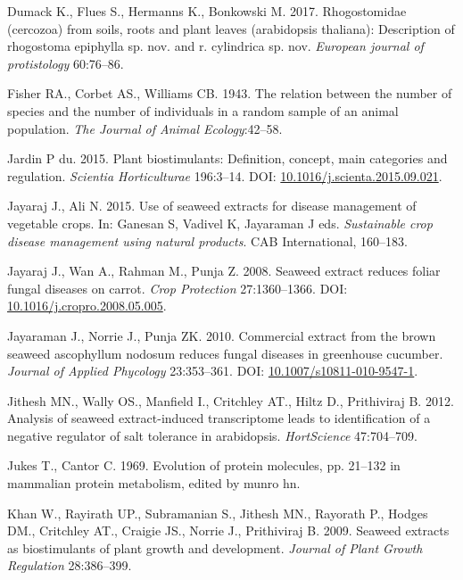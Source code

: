 \documentclass[11pt,]{article}
\begin{document}
\hypertarget{ref-dumack2017rhogostomidae}{}
Dumack K., Flues S., Hermanns K., Bonkowski M. 2017. Rhogostomidae
(cercozoa) from soils, roots and plant leaves (arabidopsis thaliana):
Description of rhogostoma epiphylla sp. nov. and r. cylindrica sp. nov.
\emph{European journal of protistology} 60:76--86.

\hypertarget{ref-fisher1943relation}{}
Fisher RA., Corbet AS., Williams CB. 1943. The relation between the
number of species and the number of individuals in a random sample of an
animal population. \emph{The Journal of Animal Ecology}:42--58.

\hypertarget{ref-duJardin2015}{}
Jardin P du. 2015. Plant biostimulants: Definition, concept, main
categories and regulation. \emph{Scientia Horticulturae} 196:3--14. DOI:
\href{https://doi.org/10.1016/j.scienta.2015.09.021}{10.1016/j.scienta.2015.09.021}.

\hypertarget{ref-Jayaraj2015sustainable}{}
Jayaraj J., Ali N. 2015. Use of seaweed extracts for disease management
of vegetable crops. In: Ganesan S, Vadivel K, Jayaraman J eds.
\emph{Sustainable crop disease management using natural products}. CAB
International, 160--183.

\hypertarget{ref-Jayaraj2008}{}
Jayaraj J., Wan A., Rahman M., Punja Z. 2008. Seaweed extract reduces
foliar fungal diseases on carrot. \emph{Crop Protection} 27:1360--1366.
DOI:
\href{https://doi.org/10.1016/j.cropro.2008.05.005}{10.1016/j.cropro.2008.05.005}.

\hypertarget{ref-Jayaraman2010}{}
Jayaraman J., Norrie J., Punja ZK. 2010. Commercial extract from the
brown seaweed ascophyllum nodosum reduces fungal diseases in greenhouse
cucumber. \emph{Journal of Applied Phycology} 23:353--361. DOI:
\href{https://doi.org/10.1007/s10811-010-9547-1}{10.1007/s10811-010-9547-1}.

\hypertarget{ref-jithesh2012analysis}{}
Jithesh MN., Wally OS., Manfield I., Critchley AT., Hiltz D.,
Prithiviraj B. 2012. Analysis of seaweed extract-induced transcriptome
leads to identification of a negative regulator of salt tolerance in
arabidopsis. \emph{HortScience} 47:704--709.

\hypertarget{ref-jukes1969evolution}{}
Jukes T., Cantor C. 1969. Evolution of protein molecules, pp. 21--132 in
mammalian protein metabolism, edited by munro hn.

\hypertarget{ref-khan2009seaweed}{}
Khan W., Rayirath UP., Subramanian S., Jithesh MN., Rayorath P., Hodges
DM., Critchley AT., Craigie JS., Norrie J., Prithiviraj B. 2009. Seaweed
extracts as biostimulants of plant growth and development. \emph{Journal
of Plant Growth Regulation} 28:386--399.
\end{document}
